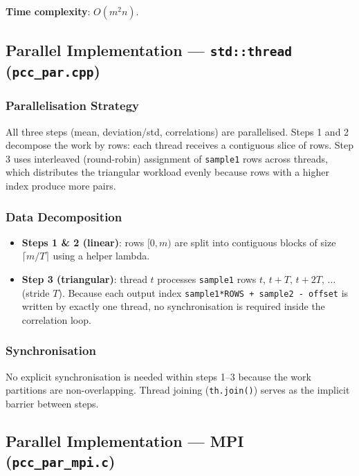 \documentclass[11pt,a4paper]{article}
\begin{document}
\textbf{Time complexity}: $O(m^2 n)$.

\subsection{Parallel Implementation --- \texttt{std::thread} (\texttt{pcc\_par.cpp})}

\subsubsection{Parallelisation Strategy}

All three steps (mean, deviation/std, correlations) are parallelised. Steps 1 and 2 decompose
the work by rows: each thread receives a contiguous slice of rows. Step 3 uses interleaved
(round-robin) assignment of \texttt{sample1} rows across threads, which distributes the
triangular workload evenly because rows with a higher index produce more pairs.

\subsubsection{Data Decomposition}

\begin{itemize}
    \item \textbf{Steps 1 \& 2 (linear)}: rows $[0, m)$ are split into contiguous blocks of
          size $\lceil m/T \rceil$ using a helper lambda.
    \item \textbf{Step 3 (triangular)}: thread $t$ processes \texttt{sample1} rows
          $t,\, t+T,\, t+2T,\,\ldots$ (stride $T$). Because each output index
          \texttt{sample1*ROWS + sample2 - offset} is written by exactly one thread, no
          synchronisation is required inside the correlation loop.
\end{itemize}

\subsubsection{Synchronisation}

No explicit synchronisation is needed within steps 1--3 because the work partitions are
non-overlapping. Thread joining (\texttt{th.join()}) serves as the implicit barrier between
steps.

\subsection{Parallel Implementation --- MPI (\texttt{pcc\_par\_mpi.c})}
\end{document}
